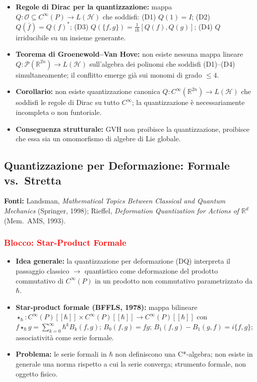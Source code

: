 \documentclass[12pt, a4paper]{article}
\newcommand{\fonti}[1]{%
	\begin{fontebox}
		\textcolor{fontecolor}{\footnotesize\textbf{Fonti:} #1}
	\end{fontebox}%
}
\begin{document}
	\begin{itemize}
		\item \textbf{Regole di Dirac per la quantizzazione:} mappa $Q: \mathcal{O} \subseteq C^\infty(P) \to L(\mathcal{H})$ che soddisfi: (D1) $Q(1)=I$; (D2) $Q(\bar{f})=Q(f)^*$; (D3) $Q(\{f,g\}) = \frac{1}{i\hbar}[Q(f),Q(g)]$; (D4) $Q$ irriducibile su un insieme generante.
		\item \textbf{Teorema di Groenewold--Van Hove:} non esiste nessuna mappa lineare $Q: \mathcal{P}(\mathbb{R}^{2n}) \to L(\mathcal{H})$ sull'algebra dei polinomi che soddisfi (D1)--(D4) simultaneamente; il conflitto emerge già sui monomi di grado $\leq 4$.
		\item \textbf{Corollario:} non esiste quantizzazione canonica $Q: C^\infty(\mathbb{R}^{2n}) \to L(\mathcal{H})$ che soddisfi le regole di Dirac su tutto $C^\infty$; la quantizzazione è necessariamente incompleta o non funtoriale.
		\item \textbf{Conseguenza strutturale:} GVH non proibisce la quantizzazione, proibisce che essa sia un omomorfismo di algebre di Lie globale.
	\end{itemize}
	
	\subsection{Quantizzazione per Deformazione: Formale vs.\ Stretta}
	
	\fonti{Landsman, \textit{Mathematical Topics Between Classical and Quantum Mechanics} (Springer, 1998); Rieffel, \textit{Deformation Quantization for Actions of $\mathbb{R}^d$} (Mem.\ AMS, 1993).}
	
	\subsubsection{\textcolor{red}{Blocco: Star-Product Formale}}
	\begin{itemize}
		\item \textbf{Idea generale:} la quantizzazione per deformazione (DQ) interpreta il passaggio classico $\to$ quantistico come deformazione del prodotto commutativo di $C^\infty(P)$ in un prodotto non commutativo parametrizzato da $\hbar$.
		\item \textbf{Star-product formale (BFFLS, 1978):} mappa bilineare $\star_\hbar: C^\infty(P)[[\hbar]] \times C^\infty(P)[[\hbar]] \to C^\infty(P)[[\hbar]]$ con $f \star_\hbar g = \sum_{k=0}^\infty \hbar^k B_k(f,g)$; $B_0(f,g)=fg$; $B_1(f,g)-B_1(g,f) = i\{f,g\}$; associatività come serie formale.
		\item \textbf{Problema:} le serie formali in $\hbar$ non definiscono una C*-algebra; non esiste in generale una norma rispetto a cui la serie converga; strumento formale, non oggetto fisico.
	\end{itemize}
	
\end{document}
